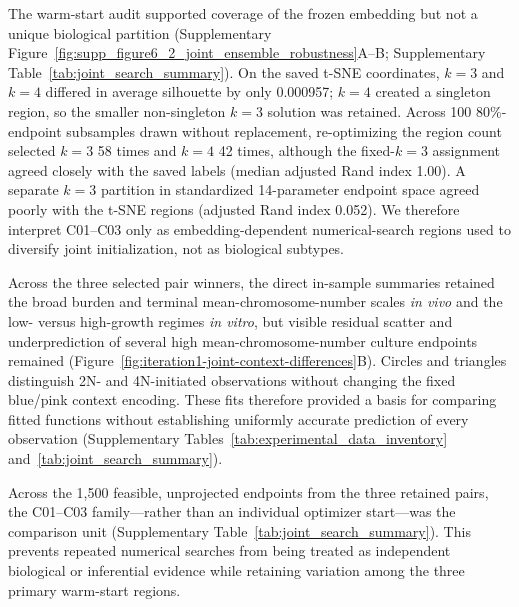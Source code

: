\documentclass[11pt]{article}
\begin{document}
The warm-start audit supported coverage of the frozen embedding but not a unique biological partition (Supplementary Figure~\ref{fig:supp_figure6_2_joint_ensemble_robustness}A--B; Supplementary Table~\ref{tab:joint_search_summary}). On the saved t-SNE coordinates, $k=3$ and $k=4$ differed in average silhouette by only 0.000957; $k=4$ created a singleton region, so the smaller non-singleton $k=3$ solution was retained. Across 100 80\%-endpoint subsamples drawn without replacement, re-optimizing the region count selected $k=3$ 58 times and $k=4$ 42 times, although the fixed-$k=3$ assignment agreed closely with the saved labels (median adjusted Rand index 1.00). A separate $k=3$ partition in standardized 14-parameter endpoint space agreed poorly with the t-SNE regions (adjusted Rand index 0.052). We therefore interpret C01--C03 only as embedding-dependent numerical-search regions used to diversify joint initialization, not as biological subtypes.

Across the three selected pair winners, the direct in-sample summaries retained the broad burden and terminal mean-chromosome-number scales \textit{in vivo} and the low- versus high-growth regimes \textit{in vitro}, but visible residual scatter and underprediction of several high mean-chromosome-number culture endpoints remained (Figure~\ref{fig:iteration1-joint-context-differences}B). Circles and triangles distinguish 2N- and 4N-initiated observations without changing the fixed blue/pink context encoding. These fits therefore provided a basis for comparing fitted functions without establishing uniformly accurate prediction of every observation (Supplementary Tables~\ref{tab:experimental_data_inventory} and~\ref{tab:joint_search_summary}).

Across the 1,500 feasible, unprojected endpoints from the three retained pairs, the C01--C03 family---rather than an individual optimizer start---was the comparison unit (Supplementary Table~\ref{tab:joint_search_summary}). This prevents repeated numerical searches from being treated as independent biological or inferential evidence while retaining variation among the three primary warm-start regions.
\end{document}
